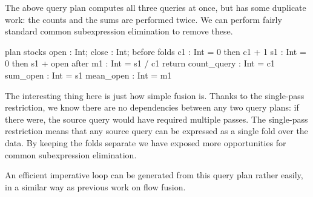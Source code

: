 The above query plan computes all three queries at once, but has some duplicate work: the counts and the sums are performed twice.
We can perform fairly standard common subexpression elimination to remove these.
\begin{code}
plan stocks { open : Int; close : Int; }
before { }
folds  { c1 : Int = 0 then c1 + 1
         s1 : Int = 0 then s1 + open }
after  { m1 : Int = s1 / c1 }
return { count_query : Int = c1
         sum_open    : Int = s1
         mean_open   : Int = m1 }
\end{code}

The interesting thing here is just how simple fusion is.
Thanks to the single-pass restriction, we know there are no dependencies between any two query plans: if there were, the source query would have required multiple passes.
The single-pass restriction means that any source query can be expressed as a single fold over the data.
By keeping the folds separate we have exposed more opportunities for common subexpression elimination.

An efficient imperative loop can be generated from this query plan rather easily, in a similar way as previous work on flow fusion\cite{lippmeier2013data}.

